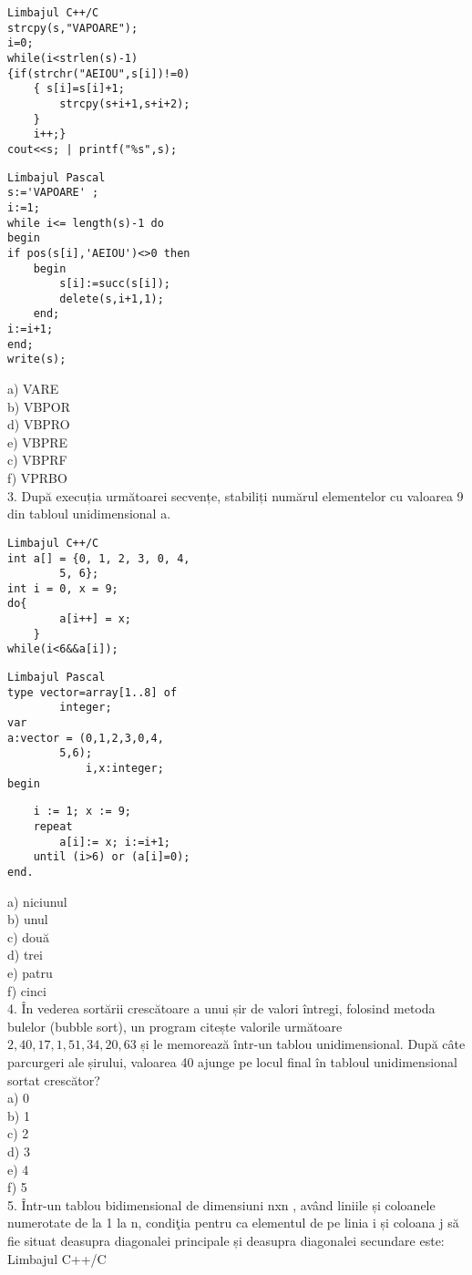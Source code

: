 \begin{verbatim}
Limbajul C++/C
strcpy(s,"VAPOARE");
i=0;
while(i<strlen(s)-1)
{if(strchr("AEIOU",s[i])!=0)
    { s[i]=s[i]+1;
        strcpy(s+i+1,s+i+2);
    }
    i++;}
cout<<s; | printf("%s",s);
\end{verbatim}

\begin{verbatim}
Limbajul Pascal
s:='VAPOARE' ;
i:=1;
while i<= length(s)-1 do
begin
if pos(s[i],'AEIOU')<>0 then
    begin
        s[i]:=succ(s[i]);
        delete(s,i+1,1);
    end;
i:=i+1;
end;
write(s);
\end{verbatim}

a) VARE\\
b) VBPOR\\
d) VBPRO\\
e) VBPRE\\
c) VBPRF\\
f) VPRBO\\
3. După execuția următoarei secvențe, stabiliți numărul elementelor cu valoarea 9 din tabloul unidimensional a.

\begin{verbatim}
Limbajul C++/C
int a[] = {0, 1, 2, 3, 0, 4,
        5, 6};
int i = 0, x = 9;
do{
        a[i++] = x;
    }
while(i<6&&a[i]);
\end{verbatim}

\begin{verbatim}
Limbajul Pascal
type vector=array[1..8] of
        integer;
var
a:vector = (0,1,2,3,0,4,
        5,6);
            i,x:integer;
begin
\end{verbatim}

\begin{verbatim}
    i := 1; x := 9;
    repeat
        a[i]:= x; i:=i+1;
    until (i>6) or (a[i]=0);
end.
\end{verbatim}

a) niciunul\\
b) unul\\
c) două\\
d) trei\\
e) patru\\
f) cinci\\
4. În vederea sortării crescătoare a unui șir de valori întregi, folosind metoda bulelor (bubble sort), un program citește valorile următoare $2,40,17,1,51,34,20,63$ și le memorează într-un tablou unidimensional. După câte parcurgeri ale șirului, valoarea 40 ajunge pe locul final în tabloul unidimensional sortat crescător?\\
a) 0\\
b) 1\\
c) 2\\
d) 3\\
e) 4\\
f) 5\\
5. Într-un tablou bidimensional de dimensiuni nxn , având liniile și coloanele numerotate de la 1 la n, condiţia pentru ca elementul de pe linia i și coloana j să fie situat deasupra diagonalei principale și deasupra diagonalei secundare este:\\
Limbajul C++/C

